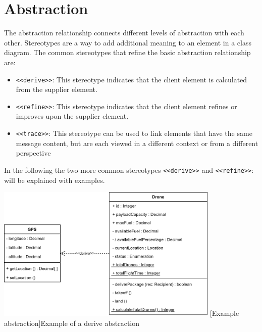 \documentclass[
	12pt,
    a4paper,
    egregdoesnotlikesansseriftitles, %
    toc=chapterentrywithdots,
    oneside, openany,
    titlepage,
    parskip=half,
    headings=normal,  %
    listof=totoc,
    bibliography=totocnumbered,
    index=totoc,
    captions=tableheading,  %
    listof=flat,
    numbers=noenddot, %
    final]
    {scrbook}
\begin{document}

\section{Abstraction}
The abstraction relationship connects different levels of abstraction with each other.
Stereotypes are a way to add additional meaning to an element in a class diagram. 
The common stereotypes that refine the basic abstraction relationship are: \cite{ibm_dependencies}
\begin{itemize}
	\item \texttt{<<derive>>}: This stereotype indicates that the client element is calculated from the supplier element.
	\item \texttt{<<refine>>}: This stereotype indicates that the client element refines or improves upon the supplier element.
	\item \texttt{<<trace>>}: This stereotype can be used to link elements that have the same message content, but are each viewed in a different context or from a different perspective
\end{itemize}

In the following the two more common stereotypes \texttt{<<derive>>} and \texttt{<<refine>>}: will be explained with examples.

\vspace{1em}
\begin{minipage}{\linewidth}
	\centering
	\includegraphics[width=0.8\textwidth]{figures/dependencies/derive.jpg}
	[Example abstraction]{Example of a derive abstraction}
	\label{fig:derive_example}
\end{minipage}
\end{document}
